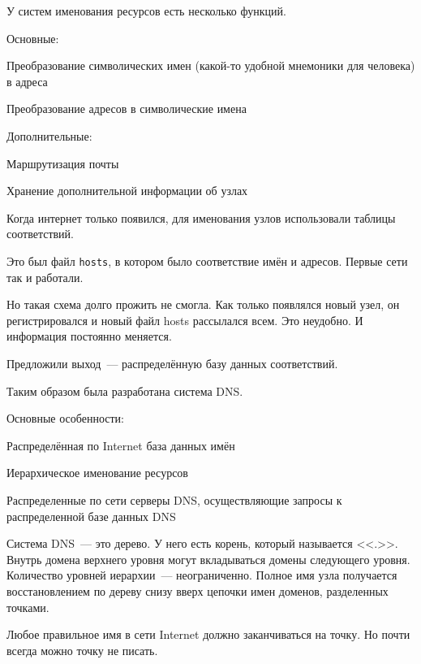 
У систем именования ресурсов есть несколько функций.

Основные:
\begin{MyItemize}
    \item Преобразование символических имен (какой-то удобной мнемоники для человека) в адреса
    \item Преобразование адресов в символические имена
\end{MyItemize}

Дополнительные:
\begin{MyItemize}
    \item Маршрутизация почты
    \item Хранение дополнительной информации об узлах
\end{MyItemize}

Когда интернет только появился, для именования узлов использовали таблицы соответствий.

Это был файл {\tt hosts}, в котором было соответствие имён и адресов. Первые сети так и работали.

Но такая схема долго прожить не смогла. Как только появлялся новый узел, он регистрировался и новый файл hosts рассылался всем. Это неудобно. И информация постоянно меняется.

Предложили выход~--- распределённую базу данных соответствий.

Таким образом была разработана система DNS.

Основные особенности:
\begin{MyItemize}
    \item Распределённая по Internet база данных имён
    \item Иерархическое именование ресурсов
    \item Распределенные по сети серверы DNS, осуществляющие запросы к распределенной базе данных DNS
\end{MyItemize}

Система DNS~--- это дерево. У него есть корень, который называется <<.>>. Внутрь домена верхнего уровня могут вкладываться домены следующего уровня. Количество уровней иерархии~--- неограниченно. Полное имя узла получается восстановлением по дереву снизу вверх цепочки имен доменов, разделенных точками.

Любое правильное имя в сети Internet должно заканчиваться на точку. Но почти всегда можно точку не писать.


